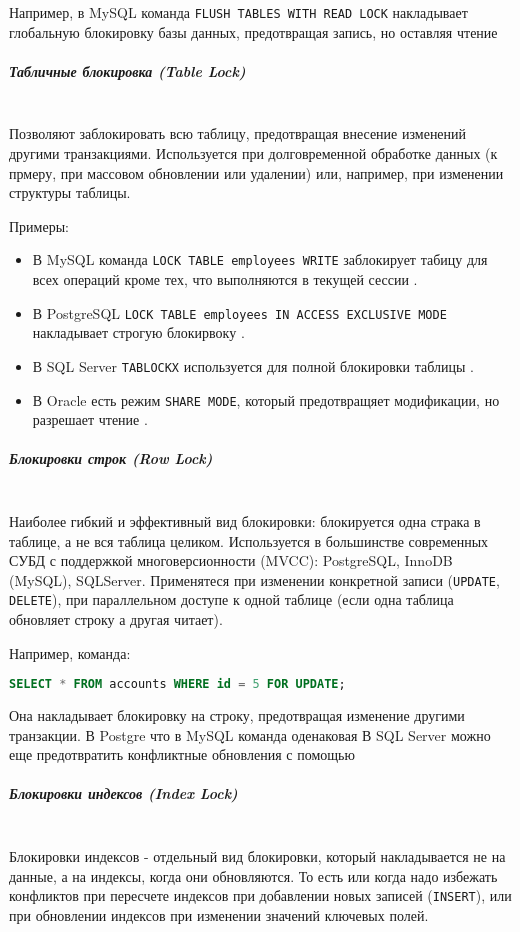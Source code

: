  Например, в MySQL команда \texttt{FLUSH TABLES WITH READ LOCK} накладывает глобальную блокировку базы данных, предотвращая запись, но оставляя чтение \autocite[§15.7.8.3]{Mysqldoc5}
 
 \subparagraph{Табличные блокировка (Table Lock)} ~\\
 Позволяют заблокировать всю таблицу, предотвращая внесение изменений другими транзакциями. Используется при долговременной обработке данных (к прмеру, при массовом обновлении или удалении) или, например, при изменении структуры таблицы.
 
 Примеры:
 \begin{itemize}
     \item В MySQL команда \texttt{LOCK TABLE employees WRITE} заблокирует табицу для всех операций кроме тех, что выполняются в текущей сессии \autocite[§15.3.6]{Mysqldoc5}.
     \item В PostgreSQL \texttt{LOCK TABLE employees IN ACCESS EXCLUSIVE MODE} накладывает строгую блокирвоку \autocite{PgReference1}.
     \item В SQL Server \texttt{TABLOCKX} используется для полной блокировки таблицы \autocite{MicrosoftLearnSQLserverTabHints}.
     \item В Oracle есть режим \texttt{SHARE MODE}, который предотвращяет модификации, но разрешает чтение \autocite[ch.18]{oracledbreference}.
 \end{itemize}
 
 \subparagraph{Блокировки строк (Row Lock)} ~\\
 Наиболее гибкий и эффективный вид блокировки: блокируется одна страка в таблице, а не вся таблица целиком. Используется в большинстве современных СУБД с поддержкой многоверсионности (MVCC): PostgreSQL, InnoDB (MySQL), SQLServer.
 Применятеся при изменении конкретной записи (\texttt{UPDATE}, \texttt{DELETE}), при параллельном доступе к одной таблице (если одна таблица обновляет строку а другая читает).
 
 Например, команда:
 \begin{lstlisting}[language=SQL]
     SELECT * FROM accounts WHERE id = 5 FOR UPDATE;
 \end{lstlisting}
 Она накладывает блокировку на строку, предотвращая изменение другими транзакции. В Postgre что в MySQL команда оденаковая
 В SQL Server можно еще предотвратить конфликтные обновления с помощью \texttt{} \autocite{MicrosoftLearnSQLserverTabHints}
 
 \subparagraph{Блокировки индексов (Index Lock)} ~\\
 Блокировки индексов - отдельный вид блокировки, который накладывается не на данные, а на индексы, когда они обновляются. То есть или когда надо избежать конфликтов при пересчете индексов при добавлении новых записей (\texttt{INSERT}), или при обновлении индексов при изменении значений ключевых полей.
 
